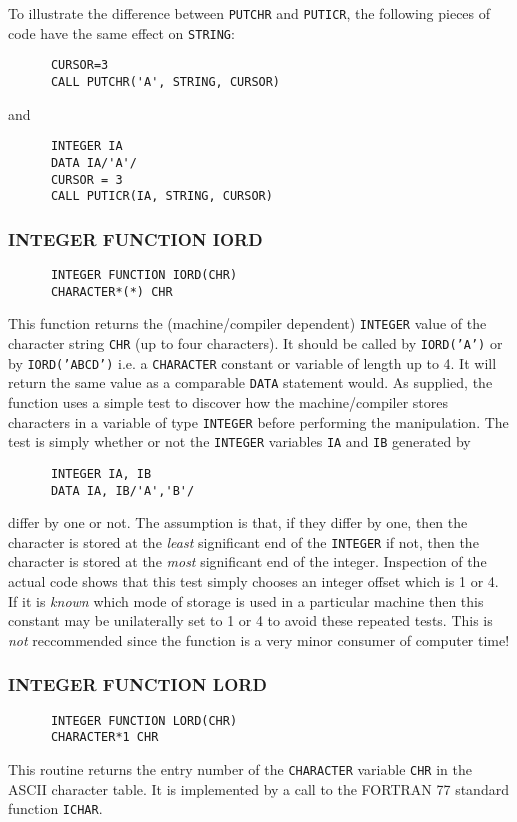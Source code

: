 To illustrate the difference between {\tt PUTCHR} and {\tt PUTICR},
the following pieces of code have the same effect on {\tt STRING}:
\begin{verbatim}
      CURSOR=3
      CALL PUTCHR('A', STRING, CURSOR)
\end{verbatim}
and
\begin{verbatim}
      INTEGER IA
      DATA IA/'A'/
      CURSOR = 3
      CALL PUTICR(IA, STRING, CURSOR)
\end{verbatim}
\subsubsection{\sf INTEGER FUNCTION IORD}
\label{iord}
\begin{verbatim}
      INTEGER FUNCTION IORD(CHR)
      CHARACTER*(*) CHR
\end{verbatim}
This function returns the 
(machine/compiler dependent) {\tt INTEGER} value of the 
character string {\tt CHR} (up to four
characters). 
It should be called by {\tt IORD('A')} or by
{\tt IORD('ABCD')} i.e. a {\tt CHARACTER} constant or
variable of length up to 4. 
It will return the same value as a comparable {\tt DATA}
statement would.
As supplied, the function uses a simple test to discover how
the machine/compiler stores characters in a variable of type
{\tt INTEGER} before performing the manipulation. The test is
simply whether or not the {\tt INTEGER} variables {\tt IA} and
{\tt IB} generated by
\begin{verbatim}
      INTEGER IA, IB
      DATA IA, IB/'A','B'/
\end{verbatim}
differ by one or not.  The assumption is that, if they differ by one,
then the character is stored at the {\em least} significant end of
the {\tt INTEGER} if not, then the character is stored at the {\em most}
significant end of the integer.
Inspection of the actual code shows that this test simply chooses
an integer offset which is 1 or 4. If it is {\em known} which mode
of storage is used in a particular machine then this constant may
be unilaterally set to 1 or 4 to avoid these repeated tests. This is
{\em not} reccommended since the function is a very minor consumer
of computer time!
\subsubsection{\sf INTEGER FUNCTION LORD}
\begin{verbatim}
      INTEGER FUNCTION LORD(CHR)
      CHARACTER*1 CHR
\end{verbatim}
This routine returns the entry number of the {\tt CHARACTER} variable
{\tt CHR} in the
ASCII character table. It is implemented by a call to the FORTRAN 77
standard function {\tt ICHAR}.
